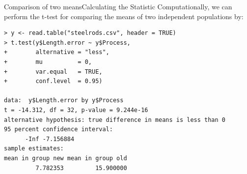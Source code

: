 
\begin{frame}[fragile]{Comparison of two means}{Calculating the Statistic}
Computationally, we can perform the t-test for comparing the means of two independent populations by:
\bigskip
{\smaller
\begin{verbatim}
> y <- read.table("steelrods.csv", header = TRUE)
> t.test(y$Length.error ~ y$Process,
+        alternative = "less",
+        mu          = 0,
+        var.equal   = TRUE,
+        conf.level  = 0.95)

data:  y$Length.error by y$Process
t = -14.312, df = 32, p-value = 9.244e-16
alternative hypothesis: true difference in means is less than 0
95 percent confidence interval:
      -Inf -7.156884
sample estimates:
mean in group new mean in group old
         7.782353         15.900000
\end{verbatim}}
\end{frame}


